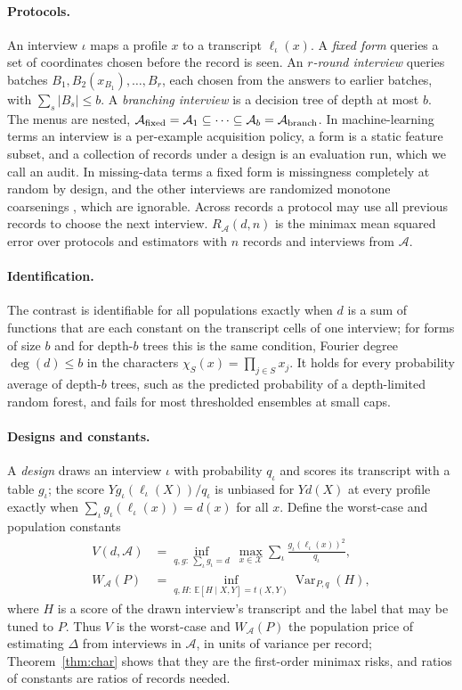 \documentclass{article}
\newcommand{\E}{\mathbb{E}}
\newcommand{\Var}{\operatorname{Var}}
\newcommand{\X}{\mathcal X}
\newcommand{\A}{\mathcal A}
\begin{document}
\paragraph{Protocols.}
An interview $\iota$ maps a profile $x$ to a transcript $\ell_\iota(x)$. A \emph{fixed form} queries a set of coordinates chosen before the record is seen. An \emph{$r$-round interview} queries batches $B_1,B_2(x_{B_1}),\ldots,B_r$, each chosen from the answers to earlier batches, with $\sum_s|B_s|\le b$. A \emph{branching interview} is a decision tree of depth at most $b$. The menus are nested, $\A_{\rm fixed}=\A_1\subseteq\cdots\subseteq\A_b=\A_{\rm branch}$. In machine-learning terms an interview is a per-example acquisition policy, a form is a static feature subset, and a collection of records under a design is an evaluation run, which we call an audit. In missing-data terms a fixed form is missingness completely at random by design, and the other interviews are randomized monotone coarsenings \citep{gill1997}, which are ignorable. Across records a protocol may use all previous records to choose the next interview. $R_\A(d,n)$ is the minimax mean squared error over protocols and estimators with $n$ records and interviews from $\A$.

\paragraph{Identification.}
The contrast is identifiable for all populations exactly when $d$ is a sum of functions that are each constant on the transcript cells of one interview; for forms of size $b$ and for depth-$b$ trees this is the same condition, Fourier degree $\deg(d)\le b$ in the characters $\chi_S(x)=\prod_{j\in S}x_j$. It holds for every probability average of depth-$b$ trees, such as the predicted probability of a depth-limited random forest, and fails for most thresholded ensembles at small caps.

\paragraph{Designs and constants.}
A \emph{design} draws an interview $\iota$ with probability $q_\iota$ and scores its transcript with a table $g_\iota$; the score $Yg_\iota(\ell_\iota(X))/q_\iota$ is unbiased for $Yd(X)$ at every profile exactly when $\sum_\iota g_\iota(\ell_\iota(x))=d(x)$ for all $x$. Define the worst-case and population constants
\begin{align}
 V(d,\A)&=\inf_{q,g:\ \sum_\iota g_\iota=d}\ \max_{x\in\X}\sum_\iota\frac{g_\iota(\ell_\iota(x))^2}{q_\iota},\label{eq:unbiasedprogram}\\
 W_{\A}(P)&=\inf_{q,H:\,\E[H\mid X,Y]=t(X,Y)}\Var_{P,q}(H),\label{eq:mainW}
\end{align}
where $H$ is a score of the drawn interview's transcript and the label that may be tuned to $P$. Thus $V$ is the worst-case and $W_\A(P)$ the population price of estimating $\Delta$ from interviews in $\A$, in units of variance per record; Theorem~\ref{thm:char} shows that they are the first-order minimax risks, and ratios of constants are ratios of records needed.
\end{document}
